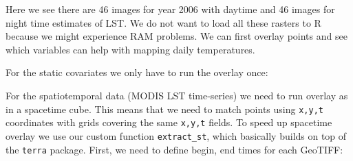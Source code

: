 \documentclass[
  graybox,natbib,nospthms]{svmono}
\newenvironment{Shaded}{\begin{snugshade}}{\end{snugshade}}
\newcommand{\CommentTok}[1]{\textcolor[rgb]{0.37,0.37,0.37}{\textit{#1}}}
\newcommand{\FunctionTok}[1]{\textcolor[rgb]{0,0,0}{#1}}
\newcommand{\NormalTok}[1]{#1}
\newcommand{\OtherTok}[1]{\textcolor[rgb]{0.37,0.37,0.37}{#1}}
\newcommand{\SpecialCharTok}[1]{\textcolor[rgb]{0,0,0}{#1}}
\begin{document}
Here we see there are 46 images for year 2006 with daytime and 46 images for
night time estimates of LST. We do not want to load all these rasters to R
because we might experience RAM problems. We can first overlay points and see
which variables can help with mapping daily temperatures.

For the static covariates we only have to run the overlay once:

\begin{Shaded}
\end{Shaded}

For the spatiotemporal data (MODIS LST time-series) we need to run overlay as in
a spacetime cube. This means that we need to match points using \texttt{x,y,t}
coordinates with grids covering the same \texttt{x,y,t} fields. To speed up spacetime overlay
we use our custom function \texttt{extract\_st}, which basically builds on top of the
\texttt{terra} package. First, we need to define begin, end times for each GeoTIFF:
\end{document}
